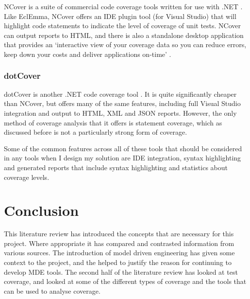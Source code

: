 NCover is a suite of commercial code coverage tools written for use with .NET \citep{NCover}. Like EclEmma, NCover offers an IDE plugin tool (for Visual Studio) that will highlight code statements to indicate the level of coverage of unit tests. NCover can output reports to HTML, and there is also a standalone desktop application that provides an `interactive view of your coverage data so you can reduce errors, keep down your costs and deliver applications on-time' \citep{NCover}. 

\subsubsection{dotCover}

dotCover is another .NET code coverage tool \cite{dotCover}. It is quite significantly cheaper than NCover, but offers many of the same features, including full Visual Studio integration and output to HTML, XML and JSON reports. However, the only method of coverage analysis that it offers is statement coverage, which as discussed before is not a particularly strong form of coverage.

Some of the common features across all of these tools that should be considered in any tools when I design my solution are IDE integration, syntax highlighting and generated reports that include syntax highlighting and statistics about coverage levels.
\section{Conclusion}

This literature review has introduced the concepts that are necessary for this project. Where appropriate it has compared and contrasted information from various sources. The introduction of model driven engineering has given some context to the project, and the helped to justify the reason for continuing to develop MDE tools. The second half of the literature review has looked at test coverage, and looked at some of the different types of coverage and the tools that can be used to analyse coverage.